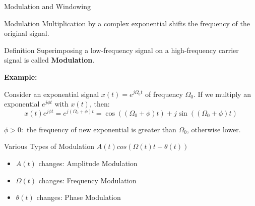 \documentclass[aspectratio=169,xcolor=dvipsnames,svgnames,x11names,fleqn]{beamer}
\begin{document}

\begin{frame}{}
    \begin{center}
    \Huge \bf \color{DarkBlue}
    \faLineChart
    
    Modulation and Windowing

\end{center}
\end{frame}

\begin{frame}{Modulation}
    Multiplication by a complex exponential shifts the frequency of the original signal.
    \begin{block}{Definition}
        Superimposing a low-frequency signal on a high-frequency carrier signal is called \textbf{Modulation}.
    \end{block}
    
   \textbf{Example:}

   Consider an exponential signal $x(t) = e^{j\Omega_0 t}$ of frequency $\Omega_0$. If we multiply an exponential $e^{j\phi t}$ with $x(t)$, then:
   $$
   x(t)e^{j\phi t} = e^{j(\Omega_0 + \phi) t} = \cos((\Omega_0 + \phi) t) + j \sin((\Omega_0 + \phi) t)
   $$

    $
    \phi > 0: 
    $ the frequency of new exponential is greater than $\Omega_0$, otherwise lower.
   
    
\end{frame}

\begin{frame}{Various Types of Modulation}
$A(t)cos( \Omega(t)t + \theta(t) )$
    \begin{itemize}
        \item $A(t)$ changes: Amplitude Modulation
\item $\Omega(t)$ changes: Frequency Modulation
\item $\theta(t)$ changes: Phase Modulation
    \end{itemize}
\end{frame}
\end{document}
